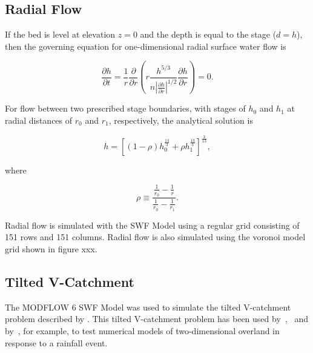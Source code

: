 \documentclass[fleqn]{article}
\begin{document}
\subsection{Radial Flow}
If the bed is level at elevation $z = 0$ and the depth is equal to the stage ($d = h$), then the governing equation for one-dimensional radial surface water flow is

\begin{equation}
  \frac{\partial h}{\partial t} = \frac{1}{r} \frac{\partial}{\partial r} 
  \left (r \frac{h^{5/3}}{n \left | \frac{\partial h}{\partial r} \right |^{1/2}} 
  \frac{\partial h}{\partial r} \right ) = 0 .
\end{equation}

\noindent For flow between two prescribed stage boundaries, with stages of $h_0$ and $h_1$ at radial distances of $r_0$ and $r_1$, respectively, the analytical solution is

\begin{equation}
  h = \left [ \left (1 - \rho \right ) h^{\frac{13}{3}}_{0} + \rho h^{\frac{13}{3}}_{1} \right ]^{\frac{3}{13}} ,
  \label{eqn:soln_ss}
\end{equation}

\noindent where

\begin{equation}
  \rho \equiv \frac{\frac{1}{r_{0}} - \frac{1}{r}}{\frac{1}{r_{0}} - \frac{1}{r_{1}}} .
  \label{eqn:rho_defined}
\end{equation}

Radial flow is simulated with the SWF Model using a regular grid consisting of 151 rows and 151 columns.  Radial flow is also simulated using the voronoi model grid shown in figure xxx.


\subsection{Tilted V-Catchment}

The MODFLOW 6 SWF Model was used to simulate the tilted V-catchment problem described by \cite{digiammarco1996}.  This tilted V-catchment problem has been used by~\cite{VanderKwaak1999},~\cite{panday2004} and by~\cite{hughes2015}, for example, to test numerical models of two-dimensional overland in response to a rainfall event.
\end{document}
